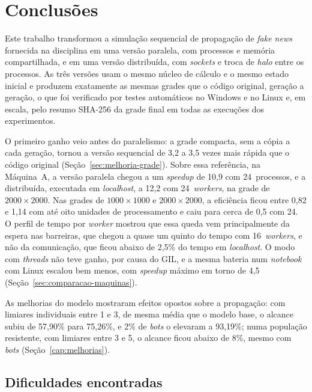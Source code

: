 
\chapter{Conclusões}\label{cap:conclusoes}

Este trabalho transformou a simulação sequencial de propagação de \textit{fake news} fornecida na disciplina em uma versão paralela, com processos e memória compartilhada, e em uma versão distribuída, com \textit{sockets} e troca de \textit{halo} entre os processos. As três versões usam o mesmo núcleo de cálculo e o mesmo estado inicial e produzem exatamente as mesmas grades que o código original, geração a geração, o que foi verificado por testes automáticos no Windows e no Linux e, em escala, pelo resumo SHA-256 da grade final em todas as execuções dos experimentos.

O primeiro ganho veio antes do paralelismo: a grade compacta, sem a cópia a cada geração, tornou a versão sequencial de 3,2 a 3,5 vezes mais rápida que o código original (Seção~\ref{sec:melhoria-grade}). Sobre essa referência, na Máquina~A, a versão paralela chegou a um \textit{speedup} de 10,9 com 24~processos, e a distribuída, executada em \textit{localhost}, a 12,2 com 24~\textit{workers}, na grade de $2000 \times 2000$. Nas grades de $1000 \times 1000$ e $2000 \times 2000$, a eficiência ficou entre 0,82 e 1,14 com até oito unidades de processamento e caiu para cerca de 0,5 com 24. O perfil de tempo por \textit{worker} mostrou que essa queda vem principalmente da espera nas barreiras, que chegou a quase um quinto do tempo com 16~\textit{workers}, e não da comunicação, que ficou abaixo de 2,5\% do tempo em \textit{localhost}. O modo com \textit{threads} não teve ganho, por causa do \ac{GIL}, e a mesma bateria num \textit{notebook} com Linux escalou bem menos, com \textit{speedup} máximo em torno de 4,5 (Seção~\ref{sec:comparacao-maquinas}).

As melhorias do modelo mostraram efeitos opostos sobre a propagação: com limiares individuais entre 1 e 3, de mesma média que o modelo base, o alcance subiu de 57,90\% para 75,26\%, e 2\% de \textit{bots} o elevaram a 93,19\%; numa população resistente, com limiares entre 3 e 5, o alcance ficou abaixo de 8\%, mesmo com \textit{bots} (Seção~\ref{cap:melhorias}).

\section{Dificuldades encontradas}

